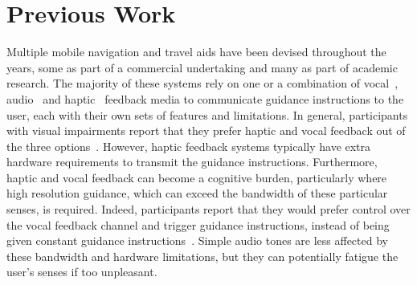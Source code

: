 \documentclass[acmsmall]{acmart}
\begin{document}
\section{Previous Work}\label{sec:prev-work}

Multiple mobile navigation and travel aids have been devised throughout the years, some as part of a commercial undertaking and many as part of academic research.
The majority of these systems rely on one or a combination of vocal~\citep{mocanu2016when,chessa2016integrated,kanwal2015navigation}, audio~\citep{schwarze2015intuitive,rodriguez2012obstacle,katz2010navig} and haptic~\citep{rivera-rubio2015assistive,lee2015rgb,xiao2015assistive} feedback media to communicate guidance instructions to the user, each with their own sets of features and limitations.
In general, participants with visual impairments report that they prefer haptic and vocal feedback out of the three options~\citep{arditi2013user}.
However, haptic feedback systems typically have extra hardware requirements to transmit the guidance instructions.
Furthermore, haptic and vocal feedback can become a cognitive burden, particularly where high resolution guidance, which can exceed the bandwidth of these particular senses, is required.
Indeed, participants report that they would prefer control over the vocal feedback channel and trigger guidance instructions, instead of being given constant guidance instructions~\citep{arditi2013user}.
Simple audio tones are less affected by these bandwidth and hardware limitations, but they can potentially fatigue the user's senses if too unpleasant.
\end{document}
